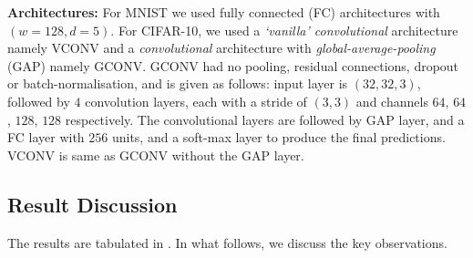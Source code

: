 \documentclass{article}
\begin{document}
\textbf{Architectures:} For MNIST we used fully connected (FC) architectures with $(w=128,d=5)$. For CIFAR-10, we used a \emph{`vanilla' convolutional} architecture namely VCONV and a \emph{convolutional} architecture with \emph{global-average-pooling} (GAP) namely GCONV. GCONV had no pooling, residual connections, dropout or batch-normalisation, and is given as follows: input layer is $(32, 32, 3)$, followed by $4$ convolution layers, each with a stride of $(3, 3)$ and channels $64$, $64$, $128$, $128$ respectively. The convolutional layers are followed by GAP layer, and a FC layer with $256$ units, and a soft-max layer to produce the final predictions. VCONV is same as GCONV without the GAP layer.

 \begin{table}[t]
\caption{Shows the test accuracy of different NPFs learning settings. Each model is trained close to $100\%$. In each run, the best test accuracy is taken and the table presents values averaged over $5$ runs.}
\label{tb:npfs}
\end{table}
\normalsize
\subsection{Result Discussion}
The results are tabulated in . In what follows, we discuss the key observations.
\end{document}
